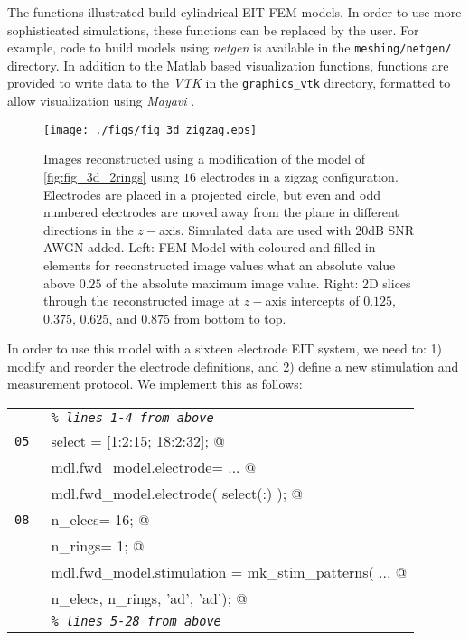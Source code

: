 \documentclass[12pt]{iopart}
\makeatletter
\newcommand{\CODEstart}{\medskip\begin{tabular}{ll}}
\newcommand{\CN}{\tt\scriptsize} %
\newcommand{\CC}{&\small\verb@}   % start code
\newcommand{\CI}{&\small\tt\em}   % start code
\newcommand{\CODEend}{\end{tabular}\medskip}
\makeatother
\begin{document}
The functions illustrated
build cylindrical EIT FEM models. In order to use more
sophisticated simulations, these functions can be replaced
by the user. For example, code to build models using {\em netgen}
\cite{Schoberl_1997}  is available in the
{\tt meshing/netgen/} directory.
In addition to the Matlab based visualization functions,
functions are provided to write data to the {\em VTK}
in the {\tt graphics\_vtk} directory,
formatted to allow visualization using {\em Mayavi}
\cite{Ramachandran_2003}.

%
% FIGURE: Zigzag electrode config
%
\begin{figure}[th]
\begin{flushright}
\texttt{[image: ./figs/fig\_3d\_zigzag.eps]}
\caption{\small
Images reconstructed using a modification of
the model of \ref{fig:fig_3d_2rings} using $16$
electrodes in a zigzag configuration. Electrodes are placed
in a projected circle, but even and odd numbered electrodes
are moved away from the plane in different directions in the
$z-$axis.
Simulated data
are used with 20dB SNR AWGN added.
Left: FEM Model with coloured and filled in elements for
reconstructed image values what an absolute value
above $0.25$ of the absolute maximum image value.
Right: 2D slices through the reconstructed image at
$z-$axis intercepts of $0.125$, $0.375$, $0.625$, and $0.875$
from bottom to top.
 \label{fig:fig_3d_zigzag}
}
\end{flushright}
\end{figure}

In order to use this model with a sixteen electrode EIT
system, we need to: 1) modify and reorder the electrode
definitions, and 2) define a new stimulation and measurement
protocol. We implement this as follows:

\CODEstart
\CN    \CI \% lines 1-4 from above \\[-3pt]
\CN 05 \CC select = [1:2:15; 18:2:32]; @\\[-3pt]
\CN    \CC mdl.fwd_model.electrode=  ... @\\[-3pt]
\CN    \CC     mdl.fwd_model.electrode( select(:) ); @\\[-3pt]
\CN 08 \CC n_elecs= 16; @\\[-3pt]
\CN    \CC n_rings= 1; @\\[-3pt]
\CN    \CC mdl.fwd_model.stimulation = mk_stim_patterns( ... @\\[-3pt]
\CN    \CC              n_elecs, n_rings, '{ad}', '{ad}'); @\\[-3pt]
\CN    \CI \% lines 5-28 from above \\[-3pt]
\CODEend
\end{document}
